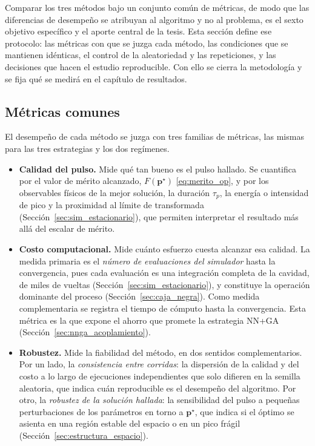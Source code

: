 Comparar los tres métodos bajo un conjunto común de métricas, de modo que las diferencias de desempeño se atribuyan al algoritmo y no al problema, es el sexto objetivo específico y el aporte central de la tesis. Esta sección define ese protocolo: las métricas con que se juzga cada método, las condiciones que se mantienen idénticas, el control de la aleatoriedad y las repeticiones, y las decisiones que hacen el estudio reproducible. Con ello se cierra la metodología y se fija qué se medirá en el capítulo de resultados.

\subsection{Métricas comunes}
\label{sec:metricas}

El desempeño de cada método se juzga con tres familias de métricas, las mismas para
las tres estrategias y los dos regímenes.

\begin{itemize}
    \item \textbf{Calidad del pulso.} Mide qué tan bueno es el pulso hallado. Se
    cuantifica por el valor de mérito alcanzado, $F(\mathbf{p}^\star)$
    \eqref{eq:merito_op}, y por los observables físicos de la mejor solución, la duración $\tau_p$, la energía o intensidad de pico y la proximidad al límite
    de transformada (Sección~\ref{sec:sim_estacionario}), que permiten interpretar
    el resultado más allá del escalar de mérito.

    \item \textbf{Costo computacional.} Mide cuánto esfuerzo cuesta alcanzar esa
    calidad. La medida primaria es el \emph{número de evaluaciones del simulador}
    hasta la convergencia, pues cada evaluación es una integración completa de la
    cavidad, de miles de vueltas (Sección~\ref{sec:sim_estacionario}), y constituye
    la operación dominante del proceso (Sección~\ref{sec:caja_negra}). Como medida
    complementaria se registra el tiempo de cómputo hasta la convergencia. Esta
    métrica es la que expone el ahorro que promete la estrategia NN+GA
    (Sección~\ref{sec:nnga_acoplamiento}).

    \item \textbf{Robustez.} Mide la fiabilidad del método, en dos sentidos
    complementarios. Por un lado, la \emph{consistencia entre corridas}: la
    dispersión de la calidad y del costo a lo largo de ejecuciones independientes que
    solo difieren en la semilla aleatoria, que indica cuán reproducible es el
    desempeño del algoritmo. Por otro, la \emph{robustez de la solución hallada}:
    la sensibilidad del pulso a pequeñas perturbaciones de los parámetros en torno a
    $\mathbf{p}^\star$, que indica si el óptimo se asienta en una región estable del
    espacio o en un pico frágil (Sección~\ref{sec:estructura_espacio}).
\end{itemize}

